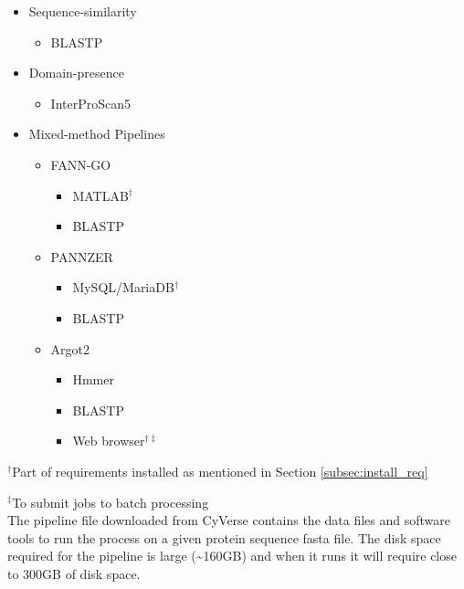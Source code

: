 \begin{itemize}
    \item Sequence-similarity
        \begin{itemize}
            \item BLASTP
        \end{itemize}
    \item Domain-presence
        \begin{itemize}
            \item InterProScan5
        \end{itemize}
    \item Mixed-method Pipelines
    \begin{itemize}
        \item FANN-GO
        \begin{itemize}
            \item MATLAB$^\dagger$  
            \item BLASTP
        \end{itemize}
        \item PANNZER
        \begin{itemize}
            \item MySQL/MariaDB$^\dagger$
            \item BLASTP
        \end{itemize}
        \item Argot2
        \begin{itemize}
            \item Hmmer
            \item BLASTP
            \item Web browser$^{\dagger\ddagger}$
        \end{itemize}
    \end{itemize}
\end{itemize}

$^\dagger$Part of requirements installed as mentioned in Section \ref{subsec:install_req}

$^\ddagger$To submit jobs to batch processing
\\

The pipeline file downloaded from CyVerse contains the data files and software tools to run the process on a given protein sequence fasta file. The disk space required for the pipeline is large (\textasciitilde{}160GB) and when it runs it will require close to 300GB of disk space.